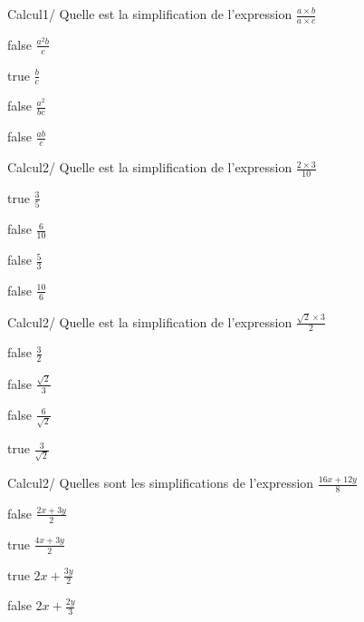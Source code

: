         	\begin{question}{9}{Calcul}{1}{/}
				Quelle est la simplification de l'expression $\frac{a \times b}{a \times c}$
            \end{question}
            \begin{reponses}
            	\item[false] $\frac{a^2b}{c}$
            	\item[true] $\frac{b}{c}$
                \item[false] $\frac{a^2}{bc}$
                \item[false] $\frac{ab}{c}$
            \end{reponses}
        	\begin{question}{9}{Calcul}{2}{/}
				Quelle est la simplification de l'expression $\frac{2 \times 3}{10}$
            \end{question}
            \begin{reponses}
            	\item[true] $\frac{3}{5}$
            	\item[false] $\frac{6}{10}$
                \item[false] $\frac{5}{3}$
                \item[false] $\frac{10}{6}$
            \end{reponses}
        	\begin{question}{9}{Calcul}{2}{/}
				Quelle est la simplification de l'expression $\frac{\sqrt{2} \times 3}{2}$
            \end{question}
            \begin{reponses}
            	\item[false] $\frac{3}{2}$
            	\item[false] $\frac{\sqrt{2}}{3}$
                \item[false] $\frac{6}{\sqrt{2}}$
                \item[true] $\frac{3}{\sqrt{2}}$
            \end{reponses}
        	\begin{question}{9}{Calcul}{2}{/}
				Quelles sont les simplifications de l'expression $\frac{16x+ 12y}{8}$
            \end{question}
            \begin{reponses}
            	\item[false] $\frac{2x+3y}{2}$
                \item[true] $\frac{4x+3y}{2}$
            	\item[true] $2x+\frac{3y}{2}$
                \item[false] $2x+\frac{2y}{3}$
            \end{reponses}

